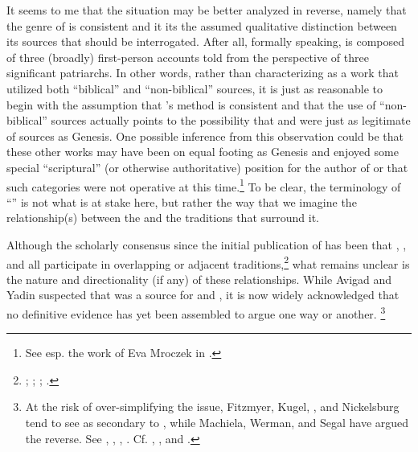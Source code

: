 It seems to me that the situation may be better analyzed in reverse, namely that the genre of \ga is consistent and it its the assumed qualitative distinction between its sources that should be interrogated. After all, formally speaking, \ga is composed of three (broadly) first-person accounts told from the perspective of three significant patriarchs. In other words, rather than characterizing \ga as a work that utilized both ``biblical'' and ``non-biblical'' sources, it is just as reasonable to begin with the assumption that \ga's method is consistent and that the use of ``non-biblical'' sources actually points to the possibility that \jub and \firstenoch were just as legitimate of sources as Genesis. One possible inference from this observation could be that these other works may have been on equal footing as Genesis and enjoyed some special ``scriptural'' (or otherwise authoritative) position for the author of \ga or that such categories were not operative at this time.\footnote{See esp. the work of Eva Mroczek in \cite*[114--155]{mroczek2016}.} To be clear, the terminology of ``\rwb'' is not what is at stake here, but rather the way that we imagine the relationship(s) between the \ga and the traditions that surround it.

Although the scholarly consensus since the initial publication of \ga has been that \firstenoch, \jub, and \ga all participate in overlapping or adjacent traditions,\footnote{\cite[38]{avigad-yadin1956}; \cite[20--22]{fitzmyer2004}; \cite[110--116]{crawford2008}; \cite[8--19]{machiela2009}.} what remains unclear is the nature and directionality (if any) of these relationships. While Avigad and Yadin suspected that \ga was a source for \firstenoch and \jub,\autocite[38]{avigad-yadin1956} it is now widely acknowledged that no definitive evidence has yet been assembled to argue one way or another.%
%
\footnote{At the risk of over-simplifying the issue, Fitzmyer, Kugel, \vanderkam, and Nickelsburg tend to see \ga as secondary to \jub, while Machiela, Werman, and Segal have argued the reverse.
See \cite{vanderkam_feldman-etal2017}, \cite[20--22]{fitzmyer2004}, \cite[174]{nickelsburg2005}, \cite[305--342]{kugel2012}. Cf. \cite{segal_as2010}, \cite[140--142]{machiela2009}, and \cite[171--177]{werman_chazon-etal1999}.}

